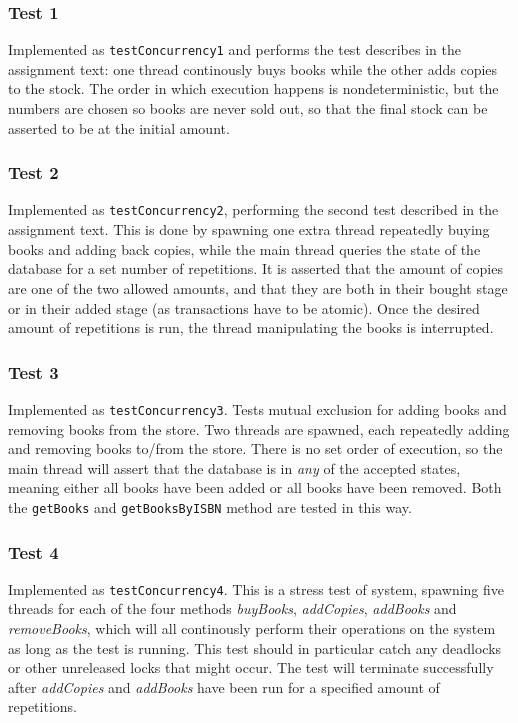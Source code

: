 \documentclass[12pt]{article}
\begin{document}
\subsubsection*{Test 1}
Implemented as \verb|testConcurrency1| and performs the test describes in the assignment text: one thread continously buys books while the other adds copies to the stock. The order in which execution happens is nondeterministic, but the numbers are chosen so books are never sold out, so that the final stock can be asserted to be at the initial amount.
\subsubsection*{Test 2}
Implemented as \verb|testConcurrency2|, performing the second test described in the assignment text. This is done by spawning one extra thread repeatedly buying books and adding back copies, while the main thread queries the state of the database for a set number of repetitions. It is asserted that the amount of copies are one of the two allowed amounts, and that they are both in their bought stage or in their added stage (as transactions have to be atomic). Once the desired amount of repetitions is run, the thread manipulating the books is interrupted.
\subsubsection*{Test 3}
Implemented as \verb|testConcurrency3|. Tests mutual exclusion for adding books and removing books from the store. Two threads are spawned, each repeatedly adding and removing books to/from the store. There is no set order of execution, so the main thread will assert that the database is in \emph{any} of the accepted states, meaning either all books have been added or all books have been removed. Both the \verb|getBooks| and \verb|getBooksByISBN| method are tested in this way.
\subsubsection*{Test 4}
Implemented as \verb|testConcurrency4|. This is a stress test of system, spawning five threads for each of the four methods \emph{buyBooks}, \emph{addCopies}, \emph{addBooks} and \emph{removeBooks}, which will all continously perform their operations on the system as long as the test is running. This test should in particular catch any deadlocks or other unreleased locks that might occur. The test will terminate successfully after \emph{addCopies} and \emph{addBooks} have been run for a specified amount of repetitions.
\end{document}
